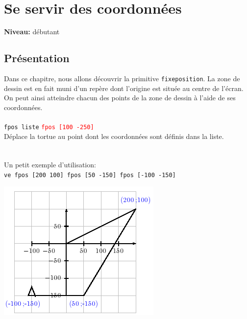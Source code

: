 \chapter{Se servir des coordonnées}
{ }\hfill\textbf{Niveau:} débutant
\section{Présentation}
\noindent Dans ce chapitre, nous allons découvrir la primitive \texttt{fixeposition}. La zone de dessin est en fait muni d'un repère dont l'origine est située au centre de l'écran. On peut ainsi atteindre chacun des points de la zone de dessin à l'aide de ses coordonnées. \\ \\
\texttt{fpos liste}\hspace {4cm } \textcolor{red}{ \texttt{fpos [100 -250]}}\\
Déplace la tortue au point dont les coordonnées sont définis dans la liste.\\ \\
\\ Un petit exemple d'utilisation:\\ 
\texttt{ve fpos [200 100] fpos [50 -150] fpos [-100 -150]}
\begin{center}
\includegraphics[scale=0.7]{images/fpos-coord.png}
\end{center}
\vspace{1cm}
